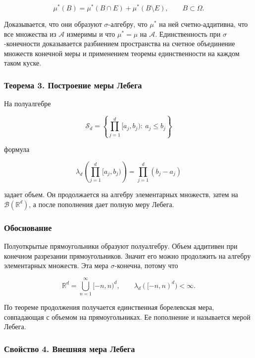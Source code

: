 \documentclass[
  11pt,
  a4paper,
]{article}
\begin{document}
\[
\mu^*(B)=\mu^*(B\cap E)+\mu^*(B\setminus E),
\qquad B\subset\Omega.
\]

Доказывается, что они образуют \(\sigma\)-алгебру, что \(\mu^*\) на ней
счетно-аддитивна, что все множества из \(\mathcal A\) измеримы и что
\(\mu^*=\mu\) на \(\mathcal A\). Единственность при
\(\sigma\)-конечности доказывается разбиением пространства на счетное
объединение множеств конечной меры и применением теоремы единственности
на каждом таком куске.

\subsubsection{Теорема 3. Построение меры
Лебега}\label{ux442ux435ux43eux440ux435ux43cux430-3.-ux43fux43eux441ux442ux440ux43eux435ux43dux438ux435-ux43cux435ux440ux44b-ux43bux435ux431ux435ux433ux430}

На полуалгебре

\[
\mathcal S_d=
\left\{
\prod_{j=1}^d[a_j,b_j):\ a_j\le b_j
\right\}
\]

формула

\[
\lambda_d\left(\prod_{j=1}^d[a_j,b_j)\right)
=
\prod_{j=1}^d(b_j-a_j)
\]

задает объем. Он продолжается на алгебру элементарных множеств, затем на
\(\mathcal B(\mathbb R^d)\), а после пополнения дает полную меру Лебега.

\subsubsection{Обоснование}\label{ux43eux431ux43eux441ux43dux43eux432ux430ux43dux438ux435}

Полуоткрытые прямоугольники образуют полуалгебру. Объем аддитивен при
конечном разрезании прямоугольников. Значит его можно продолжить на
алгебру элементарных множеств. Эта мера \(\sigma\)-конечна, потому что

\[
\mathbb R^d=\bigcup_{n=1}^{\infty}[-n,n)^d,
\qquad
\lambda_d([-n,n)^d)<\infty.
\]

По теореме продолжения получается единственная борелевская мера,
совпадающая с объемом на прямоугольниках. Ее пополнение и называется
мерой Лебега.

\subsubsection{Свойство 4. Внешняя мера
Лебега}\label{ux441ux432ux43eux439ux441ux442ux432ux43e-4.-ux432ux43dux435ux448ux43dux44fux44f-ux43cux435ux440ux430-ux43bux435ux431ux435ux433ux430}
\end{document}
